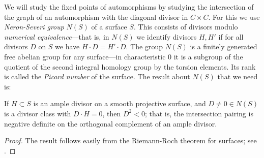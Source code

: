 We will study the fixed points of automorphisms by studying the intersection of the graph of
an automorphism with the diagonal divisor in $C\times C$. For this we use
\emph{Neron-Severi group} $N(S)$ of a surface $S$. This consists of divisors modulo \emph{numerical equivalence}---that is, in $N(S)$ we identify divisors $H, H'$ if for all divisors $D$ on $S$ we have $H\cdot D = H'\cdot D$. The group
$N(S)$ is a  finitely generated free abelian group for any surface---in characteristic 0 it is a subgroup of the quotient of the second integral homology group by the torsion elements. Its rank is called the \emph{Picard number} of the surface. The result about $N(S)$ that we need is:

\begin{theorem}\label{hodge index}
If $H\subset S$ is an ample divisor on a smooth projective surface, and $D \neq 0 \in N(S)$ is a divisor class with $D\cdot H = 0$, then 
$D^2<0$; that is, the intersection pairing is negative definite on the orthogonal complement of an
ample divisor.
\end{theorem}
\begin{proof}
The result follows easily from the Riemann-Roch theorem for surfaces; see \cite[Theorem V.1.9]{Hartshorne1977}.
\end{proof}


